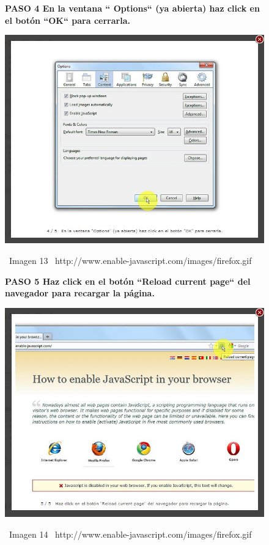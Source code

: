 \documentclass[11pt]{article} %
\begin{document}
\begin{figure}
\begin{center}

\begin{center}
\bf PASO 4
En la ventana `` Options`` (ya abierta) haz click en el botón ``OK`` para cerrarla.

\includegraphics[height=8 cm, width=8 cm] {imagenes/firefox 04.jpg}
\end{center}
\ Imagen 13
\ {http://www.enable-javascript.com/images/firefox.gif }

\begin{center}
\bf PASO 5
Haz click en el botón ``Reload current page`` del navegador para recargar la página.
\newline

\includegraphics[height=8 cm, width=8 cm] {imagenes/firefox 05.jpg}
\end{center}
\ Imagen 14
\ {http://www.enable-javascript.com/images/firefox.gif }

\end{center}
\end{figure}
\end{document}
